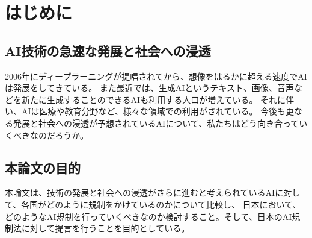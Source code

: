 \chapter{はじめに}

\section{AI技術の急速な発展と社会への浸透}
2006年にディープラーニングが提唱されてから、想像をはるかに超える速度でAIは発展をしてきている。
また最近では、生成AIというテキスト、画像、音声などを新たに生成することのできるAIも利用する人口が増えている。
それに伴い、AIは医療や教育分野など、様々な領域での利用がされている。
今後も更なる発展と社会への浸透が予想されているAIについて、私たちはどう向き合っていくべきなのだろうか。


\section{本論文の目的}
本論文は、技術の発展と社会への浸透がさらに進むと考えられているAIに対して、各国がどのように規制をかけているのかについて比較し、
日本において、どのようなAI規制を行っていくべきなのか検討すること。そして、日本のAI規制法に対して提言を行うことを目的としている。

